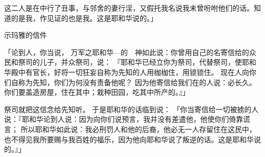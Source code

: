 {这二人是在{}中行了丑事，与邻舍的妻行淫，又假托我名说我未曾吩咐他们的话。知道的是我，作见证的也是我。这是耶和华说的。」
\par }{\SH 示玛雅的信件
\par }{\PP {}「论到{}人{}，你当说，
万军之耶和华—{}的　神如此说：你曾用自己的名寄信给{}的众民和祭司{}的儿子{}，并众祭司，说：
『耶和华已经立你{}为祭司，代替祭司{}，使耶和华殿中有官长，好将一切狂妄自称为先知的人用枷枷住，用锁锁住。
现在{}人{}向你们自称为先知，你们为何没有责备他呢？
因为他寄信给我们在{}的人说：{}必长久。你们要盖造房屋，住在其中；栽种田园，吃其中所产的。』」
\par }{\PP {}祭司{}就把这信念给先知{}听。
于是耶和华的话临到{}说：
「你当寄信给一切被掳的人说：『耶和华论到{}人{}说：因为{}向你们说预言，我并没有差遣他，他使你们倚靠谎言；
所以耶和华如此说：我必刑罚{}人{}和他的后裔，他必无一人存留住在这民中，也不得见我所要赐与我百姓的福乐，因为他向耶和华说了叛逆的话。这是耶和华说的。』」

}
